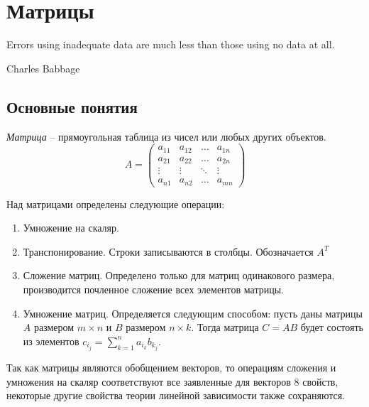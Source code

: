 \section{Матрицы}
\label{matrix}

\epigraph{Errors using inadequate data are much less than those using
  no data at all.}{Charles Babbage}

\subsection{Основные понятия}

\begin{df}
  \emph{Матрица} -- прямоугольная таблица из чисел или любых других объектов.
  $$
  A =
  \begin{pmatrix}
   a_{11}&a_{12}&\dots&a_{1n}\\
   a_{21}&a_{22}&\dots&a_{2n}\\
   \vdots&\vdots&\ddots&\vdots\\
   a_{n1}&a_{n2}&\dots&a_{mn}
  \end{pmatrix}
  $$
\end{df}

Над матрицами определены следующие операции:
\begin{enumerate}
\item Умножение на скаляр.
\item Транспонирование. Строки
  записываются в столбцы. Обозначается $A^T$
\item Сложение матриц. Определено только для матриц одинакового
  размера, производится почленное сложение всех элементов матрицы.
\item Умножение матриц. Определяется следующим способом: пусть даны
  матрицы $A$ размером $m\times n$ и $B$ размером $n\times k$. Тогда
  матрица $C=AB$ будет состоять из элементов
  $c_{i_j}=\sum\limits_{k=1}^n a_{i_k}b_{k_j}$. 
\end{enumerate}
  
Так как матрицы являются обобщением векторов, то операциям сложения и
умножения на скаляр соответствуют все заявленные для векторов 8
свойств, некоторые другие свойства теории линейной зависимости также
сохраняются.
  
